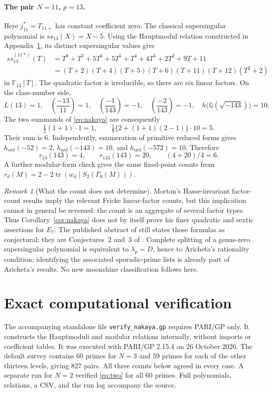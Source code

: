 \documentclass[11pt,a4paper]{article}
\theoremstyle{remark}\newtheorem{remark}[theorem]{Remark}
\numberwithin{equation}{section}
\newcommand{\Q}{\mathbb Q}\newcommand{\Z}{\mathbb Z}
\newcommand{\leg}[2]{\left(\frac{#1}{#2}\right)}
\newcommand{\ho}{h_{\mathrm{ord}}}
\newcommand{\hK}[1]{h\bigl(\Q(\sqrt{-#1})\bigr)}
\begin{document}
\paragraph{The pair $N=11$, $p=13$.}
Here $j_{11}^*=T_{11+}$ has constant coefficient zero. The classical supersingular polynomial is $ss_{13}(X)=X-5$. Using the Hauptmodul relation constructed in Appendix~\ref{app:computation}, its distinct supersingular values give
\begin{align*}
ss_{13}^{(11*)}(T)
&=T^8+T^7+5T^6+5T^5+T^4+4T^3+2T^2+9T+11\\
&=(T+2)(T+4)(T+5)(T+6)(T+11)(T+12)(T^2+2)
\end{align*}
in $\mathbb F_{13}[T]$. The quadratic factor is irreducible, so there are six linear factors. On the class-number side,
\[
L(13)=1,\quad \leg{-13}{11}=1,\quad
\leg{-1}{143}=-1,\quad \leg{-2}{143}=-1,\quad \hK{143}=10.
\]
The two summands of \eqref{eq:nakaya} are consequently
\[
\tfrac12(1+1)\cdot1=1,\qquad
\tfrac18\{2+(1+1)(2-1)\}\cdot10=5.
\]
Their sum is $6$. Independently, enumeration of primitive reduced forms gives $\ho(-52)=2$, $\ho(-143)=10$, and $\ho(-572)=10$. Therefore
\[
r_{13}(143)=4,\qquad r_{143}(143)=20,\qquad (4+20)/4=6.
\]
A further modular-form check gives the same fixed-point counts from $r_d(M)=2-2\operatorname{tr}(w_d\mid S_2(\Gamma_0(M)))$.

\begin{remark}[What the count does not determine]
Morton's Hasse-invariant factor-count results imply the relevant Fricke linear-factor counts, but this implication cannot in general be reversed: the count is an aggregate of several factor types. Thus Corollary~\ref{cor:nakaya} does not by itself prove his finer quadratic and sextic assertions for $E_7$. The published abstract of \cite{Morton7} still states those formulas as conjectural; they are Conjectures~2 and~3 of \cite{Morton7arXiv}. Complete splitting of a genus-zero supersingular polynomial is equivalent to $\lambda_p=D$, hence to Aricheta's rationality condition; identifying the associated sporadic-prime lists is already part of Aricheta's results. No new moonshine classification follows here.
\end{remark}

\appendix
\section{Exact computational verification}\label{app:computation}
The accompanying standalone file \texttt{verify\_nakaya.gp} requires PARI/GP only. It constructs the Hauptmoduli and modular relations internally, without imports or coefficient tables. It was executed with PARI/GP 2.15.4 on 26 October 2026. The default survey contains $60$ primes for $N=3$ and $59$ primes for each of the other thirteen levels, giving $827$ pairs. All three counts below agreed in every case. A separate run for $N=2$ verified \eqref{eq:two} for all $60$ primes. Full polynomials, relations, a CSV, and the run log accompany the source.
\end{document}
